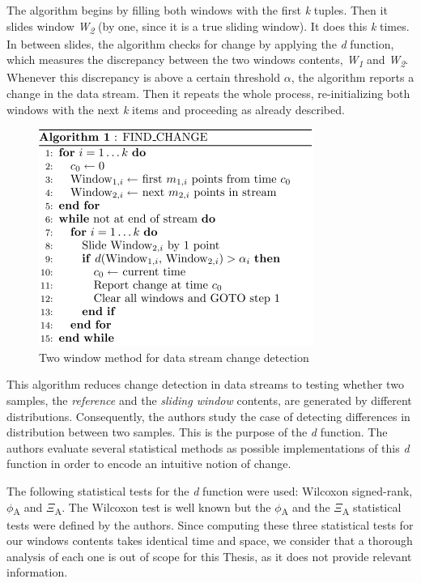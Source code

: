 The algorithm begins by filling both windows with the first \textit{k} tuples. Then it slides window \textit{W\textsubscript{2}} (by one, since it is a true sliding window). It does this \textit{k} times. In between slides, the algorithm checks for change by applying the \textit{d} function, which measures the discrepancy between the two windows contents, \textit{W\textsubscript{1}} and \textit{W\textsubscript{2}}. Whenever this discrepancy is above a certain threshold $\alpha$, the algorithm reports a change in the data stream. Then it repeats the whole process, re-initializing both windows with the next \textit{k} items and proceeding as already described. 

\begin{figure}[!htb]
    \begin{center}
      \includegraphics[scale=0.8]{figures/2-windows-change-pseudocode.png}
      \caption{Two window method for data stream change detection}
      \label{fig:change-detection-2-windows}
    \end{center}
\end{figure}

This algorithm reduces change detection in data streams to testing whether two samples, the \textit{reference} and the \textit{sliding window} contents, are generated by different distributions. Consequently, the authors study the case of detecting differences in distribution between two samples. This is the purpose of the \textit{d} function. The authors evaluate several statistical methods as possible implementations of this \textit{d} function in order to encode an intuitive notion of change.

The following statistical tests for the \textit{d} function were used: Wilcoxon signed-rank, $\phi$\textsubscript{A} and $\Xi$\textsubscript{A}. The Wilcoxon test is well known but the $\phi$\textsubscript{A} and the $\Xi$\textsubscript{A} statistical tests were defined by the authors. Since computing these three statistical tests for our windows contents takes identical time and space, we consider that a thorough analysis of each one is out of scope for this Thesis, as it does not provide relevant information. 

